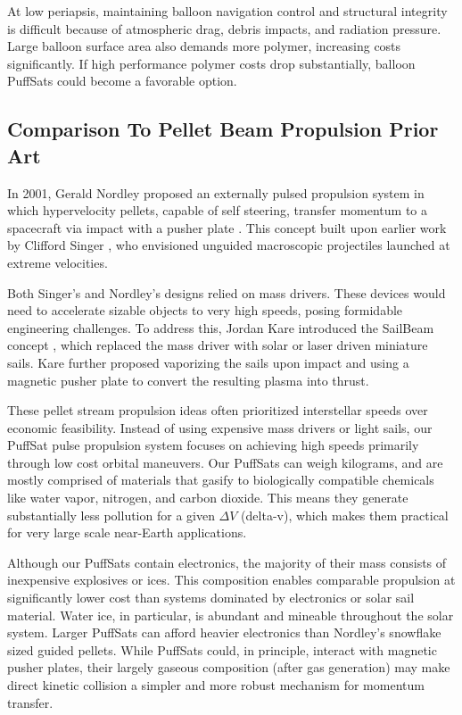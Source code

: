 \documentclass{article}
\begin{document}
At low periapsis, maintaining balloon navigation control and structural integrity is difficult because of  atmospheric drag, debris impacts, and radiation pressure. Large balloon surface area also demands more polymer, increasing costs significantly. If high performance polymer costs drop substantially, balloon PuffSats could become a favorable option.

\subsection{Comparison To Pellet Beam Propulsion Prior Art}
In 2001, Gerald Nordley proposed an externally pulsed propulsion system in which hypervelocity pellets, capable of self steering, transfer momentum to a spacecraft via impact with a pusher plate \cite{nordley2001interstellar}. This concept built upon earlier work by Clifford Singer \cite{singer1979interstellar}, who envisioned unguided macroscopic projectiles launched at extreme velocities. 

Both Singer’s and Nordley’s designs relied on mass drivers.  These devices would need to accelerate sizable objects to very high speeds, posing formidable engineering challenges. To address this, Jordan Kare introduced the SailBeam concept \cite{kare2001sailbeam}, which replaced the mass driver with solar or laser driven miniature sails. Kare further proposed vaporizing the sails upon impact and using a magnetic pusher plate to convert the resulting plasma into thrust.   

These pellet stream propulsion ideas often prioritized interstellar speeds over economic feasibility.  Instead of using expensive mass drivers or light sails, our PuffSat pulse propulsion system focuses on achieving high speeds primarily through low cost orbital maneuvers.   Our PuffSats can weigh kilograms, and are mostly comprised of materials that gasify to biologically compatible chemicals like water vapor, nitrogen, and carbon dioxide.   This means they generate substantially less pollution for a given $\Delta V$ (delta-v), which makes them practical for very large scale near-Earth applications.  

Although our PuffSats contain electronics, the majority of their mass consists of inexpensive explosives or ices. This composition enables comparable propulsion at significantly lower cost than systems dominated by electronics or solar sail material. Water ice, in particular, is abundant and mineable throughout the solar system.  Larger PuffSats can afford heavier electronics than Nordley's snowflake sized guided pellets.  While PuffSats could, in principle, interact with magnetic pusher plates, their largely gaseous composition (after gas generation) may make direct kinetic collision a simpler and more robust mechanism for momentum transfer. 
\end{document}
